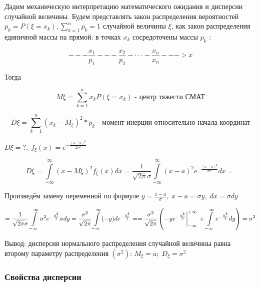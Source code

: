 ﻿\documentclass[a4paper,12pt]{report}
\begin{document}
	Дадим механическую интерпретацию математического ожидания и дисперсии случайной величины. Будем представлять закон распределения вероятностей $p_k = P(\xi = x_k), \sum\limits^n_{k=1}p_k = 1$ случайной величины $\xi$, как закон распределения единичной массы на прямой: в точках $x_k$ сосредоточены массы $p_k$ : 
	
	$$
	  ---\frac{x_1}{p_1}---\frac{x_2}{p_2}- \cdot \cdot \cdot -\frac{x_n}{x_n}--->x
	$$
	
	Тогда 
	
	$$
	  M\xi = \sum^n_{k=1} x_k P(\xi=x_k) \mbox{ - центр тяжести СМАТ}	
	$$ 

	$$
	  D\xi = \sum^n_{k=1} (x_k - M_\xi)^2 * p_k \mbox{ - момент инерции относительно начала координат}
	$$

 	 $D\xi = ?, \; f_\xi(x) = e^{-\frac{(x-a)^2}{2\sigma^2}}$

 	
 	$$
 	  D\xi = \int\limits^\infty_{-\infty}(x-M\xi)^2 f_\xi(x) dx
 	       = \frac{1}{\sqrt{2\pi}\sigma}\int\limits^\infty_{-\infty} (x-a)^2 e^{-\frac{(x-a)^2}{2\sigma^2}} dx
 	       = 
 	$$
 
 	Произведём замену переменной по формуле $y = \frac{x-a}{\sigma}, \; x - a = \sigma y, \; dx = \sigma dy$
 
 	$$
 	   = \frac{1}{\sqrt{2\pi}\sigma} \int\limits_{-\infty}^\infty \sigma^2 e^{-\frac{y^2}{2}} \sigma dy 
 	   = \frac{\sigma^2}{\sqrt{2\pi}}  \int\limits _{-\infty}^\infty (-y ) de^{-\frac{y^2}{2}} 
	   =
 	   = \frac{\sigma^2}{\sqrt{2\pi}} \left( \left. -ye^{-\frac{y^2}{2}} \right|^{+\infty}_{-\infty} \strut 
 	     + \int\limits_{-\infty}^\infty e^{-\frac{y^2}{2}} dy \right)
 	   = \sigma^2
 	 $$
 
	 Вывод: дисперсия нормального распределения случайной величины равна второму параметру распределения $(\sigma^2)$: $M_\xi = a; \; D_\xi = \sigma^2$

	


	
\subsubsection{Свойства дисперсии}
\end{document}
